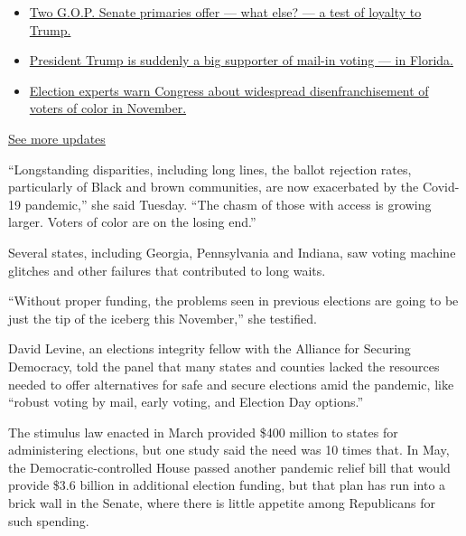 \begin{itemize}
\tightlist
\item
  \href{https://www.nytimes.com/2020/08/04/us/elections/primary-election-michigan-arizona-kansas.html?action=click\&pgtype=Article\&state=default\&region=MAIN_CONTENT_1\&context=storylines_live_updates\#link-3924dd44}{Two
  G.O.P. Senate primaries offer --- what else? --- a test of loyalty to
  Trump.}
\item
  \href{https://www.nytimes.com/2020/08/04/us/elections/primary-election-michigan-arizona-kansas.html?action=click\&pgtype=Article\&state=default\&region=MAIN_CONTENT_1\&context=storylines_live_updates\#link-32b39e33}{President
  Trump is suddenly a big supporter of mail-in voting --- in Florida.}
\item
  \href{https://www.nytimes.com/2020/08/04/us/elections/primary-election-michigan-arizona-kansas.html?action=click\&pgtype=Article\&state=default\&region=MAIN_CONTENT_1\&context=storylines_live_updates\#link-6d019753}{Election
  experts warn Congress about widespread disenfranchisement of voters of
  color in November.}
\end{itemize}

\href{https://www.nytimes.com/2020/08/04/us/elections/primary-election-michigan-arizona-kansas.html?action=click\&pgtype=Article\&state=default\&region=MAIN_CONTENT_1\&context=storylines_live_updates}{See
more updates}

``Longstanding disparities, including long lines, the ballot rejection
rates, particularly of Black and brown communities, are now exacerbated
by the Covid-19 pandemic,'' she said Tuesday. ``The chasm of those with
access is growing larger. Voters of color are on the losing end.''

Several states, including Georgia, Pennsylvania and Indiana, saw voting
machine glitches and other failures that contributed to long waits.

``Without proper funding, the problems seen in previous elections are
going to be just the tip of the iceberg this November,'' she testified.

David Levine, an elections integrity fellow with the Alliance for
Securing Democracy, told the panel that many states and counties lacked
the resources needed to offer alternatives for safe and secure elections
amid the pandemic, like ``robust voting by mail, early voting, and
Election Day options.''

The stimulus law enacted in March provided \$400 million to states for
administering elections, but one study said the need was 10 times that.
In May, the Democratic-controlled House passed another pandemic relief
bill that would provide \$3.6 billion in additional election funding,
but that plan has run into a brick wall in the Senate, where there is
little appetite among Republicans for such spending.

